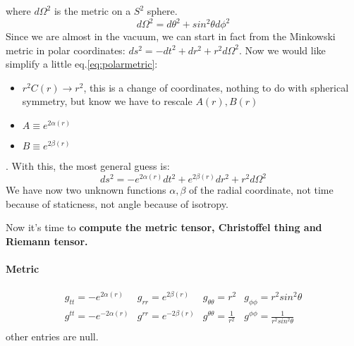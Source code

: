 where $d\Omega ^{2}$ is the metric on a $S^{2}$ sphere.
\[
	d\Omega ^{2} = d\theta ^{2} + sin^{2}\theta d\phi ^{2}
\]
Since we are almost in the vacuum, we can start in fact from the Minkowski metric in polar coordinates: $ds^{2 }=-dt^{2} +dr^{2}+r^{2}d\Omega ^{2} $.
Now we would like simplify a little eq.\ref{eq:polarmetric}:
\begin{itemize}
\item $r^{2}C\left( r \right) \to  r^{2}$, this is a change of coordinates, nothing to do with spherical symmetry, but know we have to rescale $A\left( r \right), B\left( r \right)$
\item $A \equiv e^{2\alpha \left( r \right)}$
\item $B\equiv e^{2\beta \left( r \right)}$
\end{itemize}.
With this, the most general guess is:
\begin{equation}\label{eq:pmetric2}
ds^{2} = -e^{2\alpha \left( r \right)}dt^{2} + e^{2\beta \left( r \right)}dr^{2} + r^{2}d\Omega ^{2}
\end{equation}
We have now two unknown functions $\alpha ,\beta $ of the radial coordinate, not time because of staticness, not angle because of isotropy.\par
Now it's time to \textbf{compute the metric tensor, Christoffel thing and Riemann tensor.}\par
\paragraph{Metric} 
\begin{equation}
\begin{matrix} 
g_{tt}= -e^{2\alpha \left( r \right)} & g_{rr}=e^{2\beta \left( r \right)} & g_{\theta \theta }= r^{2} & g_{\phi \phi } = r^{2}sin^{2}\theta  \\
g^{tt}=-e^{-2\alpha \left( r \right)} & g^{rr}=e^{-2\beta \left( r \right)} & g^{\theta \theta }= \frac{1}{r^{2}} & g^{\phi \phi }=\frac{1}{r^{2}sin^{2}\theta } \\
\end{matrix}
\end{equation}
other entries are null.
